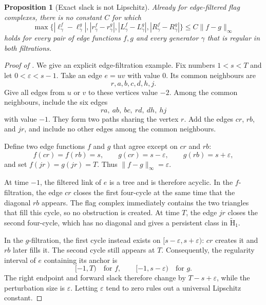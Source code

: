 \documentclass[10pt,a4paper]{amsart}
\newcommand{\eps}{\varepsilon}
\newcommand{\redH}{\widetilde{\mathrm H}}
\theoremstyle{plain}
\newtheorem{proposition}[theorem]{Proposition}
\theoremstyle{definition}
\begin{document}
\begin{proposition}[Exact slack is not Lipschitz]
\label{prop:no-go}
Already for edge-filtered flag complexes, there is no constant $C$ for which
$$
\max\{|\ell_\gamma^f-\ell_\gamma^g|,
       |r_\gamma^f-r_\gamma^g|,
       |L_\gamma^f-L_\gamma^g|,
       |R_\gamma^f-R_\gamma^g|\}
\leq C\|f-g\|_\infty
$$
holds for every pair of edge functions $f,g$ and every generator $\gamma$
that is regular in both filtrations.
\end{proposition}

\begin{proof}[Proof of ]
We give an explicit edge-filtration example. Fix numbers $1<s<T$ and let
$0<\eps<s-1$. Take an edge $e=uv$ with value $0$. Its common neighbours are
$$
r,a,b,c,d,h,j.
$$
Give all edges from $u$ or $v$ to these vertices value $-2$. Among the common
neighbours, include the six edges
$$
ra,\ ab,\ bc,\ rd,\ dh,\ hj
$$
with value $-1$. They form two paths sharing the vertex $r$. Add the edges
$cr$, $rb$, and $jr$, and include no other edges among the common neighbours.

Define two edge functions $f$ and $g$ that agree except on $cr$ and $rb$:
$$
f(cr)=f(rb)=s,
\qquad
g(cr)=s-\eps,
\qquad
g(rb)=s+\eps,
$$
and set $f(jr)=g(jr)=T$. Thus $\|f-g\|_\infty=\eps$.

At time $-1$, the filtered link of $e$ is a tree and is therefore acyclic. In
the $f$-filtration, the edge $cr$ closes the first four-cycle at the same time
that the diagonal $rb$ appears. The flag complex immediately contains the two
triangles that fill this cycle, so no obstruction is created. At time $T$, the
edge $jr$ closes the second four-cycle, which has no diagonal and gives a
persistent class in $\redH_1$.

In the $g$-filtration, the first cycle instead exists on
$[s-\eps,s+\eps)$: $cr$ creates it and $rb$ later fills it. The second cycle
still appears at $T$. Consequently, the regularity interval of $e$ containing
its anchor is
$$
[-1,T)
\quad\text{for }f,
\qquad
[-1,s-\eps)
\quad\text{for }g.
$$
The right endpoint and forward slack therefore change by
$T-s+\eps$, while the perturbation size is $\eps$. Letting $\eps$ tend to
zero rules out a universal Lipschitz constant.
\end{proof}
\end{document}
